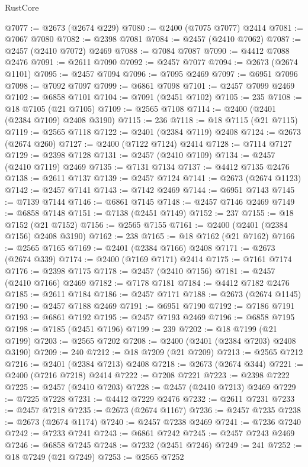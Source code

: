 \begin{lexlean}{RustCore}
\begin{coremodule}
@7077 := @2673 (@2674 @229)
@7080 := @2400 (@7075 @7077) @2414
@7081 := @7067 @7080
@7082 := @2398 @7081
@7084 := @2457 (@2410 @7062)
@7087 := @2457 (@2410 @7072) @2469
@7088 := @7084 @7087
@7090 := @4412 @7088 @2476
@7091 := @2611 @7090
@7092 := @2457 @7077
@7094 := @2673 (@2674 @1101)
@7095 := @2457 @7094
@7096 := @7095 @2469
@7097 := @6951 @7096
@7098 := @7092 @7097
@7099 := @6861 @7098
@7101 := @2457 @7099 @2469
@7102 := @6858 @7101
@7104 := @7091 (@2451 @7102)
@7105 := 235
@7108 := @18 @7105 (@21 @7105)
@7109 := @2565 @7108
@7114 := @2400 (@2401 (@2384 @7109) @2408 @3190)
@7115 := 236
@7118 := @18 @7115 (@21 @7115)
@7119 := @2565 @7118
@7122 := @2401 (@2384 @7119) @2408
@7124 := @2673 (@2674 @260)
@7127 := @2400 (@7122 @7124) @2414
@7128 := @7114 @7127
@7129 := @2398 @7128
@7131 := @2457 (@2410 @7109)
@7134 := @2457 (@2410 @7119) @2469
@7135 := @7131 @7134
@7137 := @4412 @7135 @2476
@7138 := @2611 @7137
@7139 := @2457 @7124
@7141 := @2673 (@2674 @1123)
@7142 := @2457 @7141
@7143 := @7142 @2469
@7144 := @6951 @7143
@7145 := @7139 @7144
@7146 := @6861 @7145
@7148 := @2457 @7146 @2469
@7149 := @6858 @7148
@7151 := @7138 (@2451 @7149)
@7152 := 237
@7155 := @18 @7152 (@21 @7152)
@7156 := @2565 @7155
@7161 := @2400 (@2401 (@2384 @7156) @2408 @3190)
@7162 := 238
@7165 := @18 @7162 (@21 @7162)
@7166 := @2565 @7165
@7169 := @2401 (@2384 @7166) @2408
@7171 := @2673 (@2674 @339)
@7174 := @2400 (@7169 @7171) @2414
@7175 := @7161 @7174
@7176 := @2398 @7175
@7178 := @2457 (@2410 @7156)
@7181 := @2457 (@2410 @7166) @2469
@7182 := @7178 @7181
@7184 := @4412 @7182 @2476
@7185 := @2611 @7184
@7186 := @2457 @7171
@7188 := @2673 (@2674 @1145)
@7190 := @2457 @7188 @2469
@7191 := @6951 @7190
@7192 := @7186 @7191
@7193 := @6861 @7192
@7195 := @2457 @7193 @2469
@7196 := @6858 @7195
@7198 := @7185 (@2451 @7196)
@7199 := 239
@7202 := @18 @7199 (@21 @7199)
@7203 := @2565 @7202
@7208 := @2400 (@2401 (@2384 @7203) @2408 @3190)
@7209 := 240
@7212 := @18 @7209 (@21 @7209)
@7213 := @2565 @7212
@7216 := @2401 (@2384 @7213) @2408
@7218 := @2673 (@2674 @344)
@7221 := @2400 (@7216 @7218) @2414
@7222 := @7208 @7221
@7223 := @2398 @7222
@7225 := @2457 (@2410 @7203)
@7228 := @2457 (@2410 @7213) @2469
@7229 := @7225 @7228
@7231 := @4412 @7229 @2476
@7232 := @2611 @7231
@7233 := @2457 @7218
@7235 := @2673 (@2674 @1167)
@7236 := @2457 @7235
@7238 := @2673 (@2674 @1174)
@7240 := @2457 @7238 @2469
@7241 := @7236 @7240
@7242 := @7233 @7241
@7243 := @6861 @7242
@7245 := @2457 @7243 @2469
@7246 := @6858 @7245
@7248 := @7232 (@2451 @7246)
@7249 := 241
@7252 := @18 @7249 (@21 @7249)
@7253 := @2565 @7252

\end{coremodule}
\end{lexlean}
